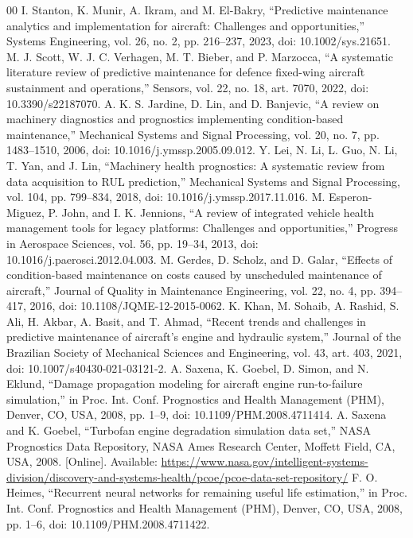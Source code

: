 \documentclass[conference]{IEEEtran}
\begin{document}
\begin{thebibliography}{00}
 I. Stanton, K. Munir, A. Ikram, and M. El-Bakry, ``Predictive maintenance analytics and implementation for aircraft: Challenges and opportunities,'' Systems Engineering, vol. 26, no. 2, pp. 216--237, 2023, doi: 10.1002/sys.21651.
 M. J. Scott, W. J. C. Verhagen, M. T. Bieber, and P. Marzocca, ``A systematic literature review of predictive maintenance for defence fixed-wing aircraft sustainment and operations,'' Sensors, vol. 22, no. 18, art. 7070, 2022, doi: 10.3390/s22187070.
 A. K. S. Jardine, D. Lin, and D. Banjevic, ``A review on machinery diagnostics and prognostics implementing condition-based maintenance,'' Mechanical Systems and Signal Processing, vol. 20, no. 7, pp. 1483--1510, 2006, doi: 10.1016/j.ymssp.2005.09.012.
 Y. Lei, N. Li, L. Guo, N. Li, T. Yan, and J. Lin, ``Machinery health prognostics: A systematic review from data acquisition to RUL prediction,'' Mechanical Systems and Signal Processing, vol. 104, pp. 799--834, 2018, doi: 10.1016/j.ymssp.2017.11.016.
 M. Esperon-Miguez, P. John, and I. K. Jennions, ``A review of integrated vehicle health management tools for legacy platforms: Challenges and opportunities,'' Progress in Aerospace Sciences, vol. 56, pp. 19--34, 2013, doi: 10.1016/j.paerosci.2012.04.003.
 M. Gerdes, D. Scholz, and D. Galar, ``Effects of condition-based maintenance on costs caused by unscheduled maintenance of aircraft,'' Journal of Quality in Maintenance Engineering, vol. 22, no. 4, pp. 394--417, 2016, doi: 10.1108/JQME-12-2015-0062.
 K. Khan, M. Sohaib, A. Rashid, S. Ali, H. Akbar, A. Basit, and T. Ahmad, ``Recent trends and challenges in predictive maintenance of aircraft's engine and hydraulic system,'' Journal of the Brazilian Society of Mechanical Sciences and Engineering, vol. 43, art. 403, 2021, doi: 10.1007/s40430-021-03121-2.
 A. Saxena, K. Goebel, D. Simon, and N. Eklund, ``Damage propagation modeling for aircraft engine run-to-failure simulation,'' in Proc. Int. Conf. Prognostics and Health Management (PHM), Denver, CO, USA, 2008, pp. 1--9, doi: 10.1109/PHM.2008.4711414.
 A. Saxena and K. Goebel, ``Turbofan engine degradation simulation data set,'' NASA Prognostics Data Repository, NASA Ames Research Center, Moffett Field, CA, USA, 2008. [Online]. Available: \url{https://www.nasa.gov/intelligent-systems-division/discovery-and-systems-health/pcoe/pcoe-data-set-repository/}
 F. O. Heimes, ``Recurrent neural networks for remaining useful life estimation,'' in Proc. Int. Conf. Prognostics and Health Management (PHM), Denver, CO, USA, 2008, pp. 1--6, doi: 10.1109/PHM.2008.4711422.

\end{thebibliography}
\end{document}
